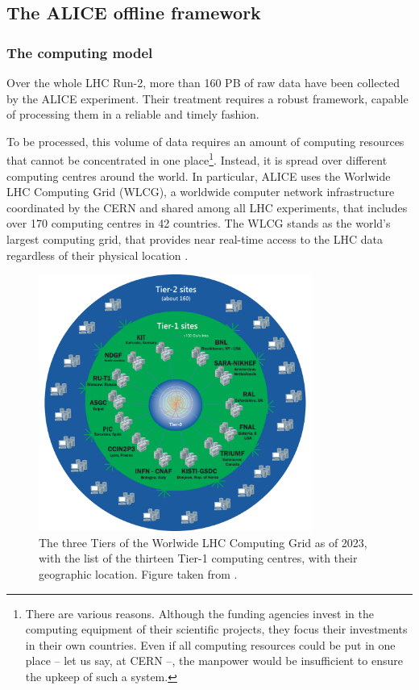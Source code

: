 \subsection{The ALICE offline framework}

\subsubsection{The computing model}
\label{subsubsec:computingmodel}

Over the whole LHC Run-2, more than 160 PB of raw data have been collected by the ALICE experiment. Their treatment requires a robust framework, capable of processing them in a reliable and timely fashion. 

To be processed, this volume of data requires an amount of computing resources that cannot be concentrated in one place\footnote{There are various reasons. Although the funding agencies invest in the computing equipment of their scientific projects, they focus their investments in their own countries. Even if all computing resources could be put in one place -- let us say, at CERN --, the manpower would be insufficient to ensure the upkeep of such a system.}. Instead, it is spread over different computing centres around the world. In particular, ALICE uses the Worlwide LHC Computing Grid (WLCG), a worldwide computer network infrastructure coordinated by the CERN and shared among all LHC experiments, that includes over 170 computing centres in 42 countries. The WLCG stands as the world's largest computing grid, that provides near real-time access to the LHC data regardless of their physical location \cite{worldwidelhccomputinggridWorldwideLHCComputing}.

\begin{figure}[b]
	\centering
	\includegraphics[width=0.8\textwidth]{Figs/Chapter3/WLCG-Tiers-2021_v3_1.png}
	\caption{The three Tiers of the Worlwide LHC Computing Grid as of 2023, with the list of the thirteen Tier-1 computing centres, with their geographic location. Figure taken from \cite{worldwidelhccomputinggridWorldwideLHCComputing}.}
	\label{fig:WLCG}
\end{figure}

